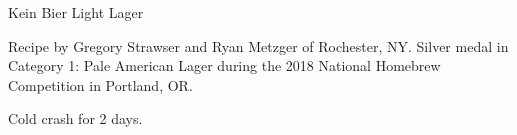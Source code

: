 \begin{recipe}{Kein Bier Light Lager} %

\begin{aboutblock}
Recipe by Gregory Strawser and Ryan Metzger of Rochester, NY. Silver medal in
Category 1: Pale American Lager during the 2018 National Homebrew Competition in
Portland, OR.
\sourceaha
\end{aboutblock}


\begin{methodandtiming}

\begin{mashsteps}
\end{mashsteps}

\begin{fermentationsteps}
\end{fermentationsteps}

\begin{directions}
Cold crash for 2 days.
\end{directions}

\end{methodandtiming}

\recipebreak

\begin{ingredientsblock}

\begin{malts}
\end{malts}

\begin{hops}
\end{hops}


\end{ingredientsblock}

\end{recipe}

